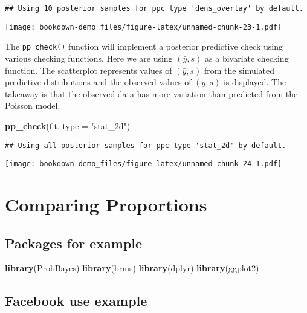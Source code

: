 \documentclass[
]{book}
\newenvironment{Shaded}{\begin{snugshade}}{\end{snugshade}}
\newcommand{\DataTypeTok}[1]{\textcolor[rgb]{0.13,0.29,0.53}{#1}}
\newcommand{\KeywordTok}[1]{\textcolor[rgb]{0.13,0.29,0.53}{\textbf{#1}}}
\newcommand{\NormalTok}[1]{#1}
\newcommand{\StringTok}[1]{\textcolor[rgb]{0.31,0.60,0.02}{#1}}
\begin{document}
\begin{verbatim}
## Using 10 posterior samples for ppc type 'dens_overlay' by default.
\end{verbatim}

\texttt{[image: bookdown-demo\_files/figure-latex/unnamed-chunk-23-1.pdf]}

The \texttt{pp\_check()} function will implement a posterior predictive check using various checking functions. Here we are using \((\bar y, s)\) as a bivariate checking function. The scatterplot represents values of \((\bar y, s)\) from the simulated predictive distributions and the observed values of \((\bar y, s)\) is displayed. The takeaway is that the observed data has more variation than predicted from the Poisson model.

\begin{Shaded}
\begin{Highlighting}[]
\KeywordTok{pp_check}\NormalTok{(fit, }\DataTypeTok{type =} \StringTok{"stat_2d"}\NormalTok{)}
\end{Highlighting}
\end{Shaded}

\begin{verbatim}
## Using all posterior samples for ppc type 'stat_2d' by default.
\end{verbatim}

\texttt{[image: bookdown-demo\_files/figure-latex/unnamed-chunk-24-1.pdf]}

\hypertarget{comparing-proportions}{%
\chapter{Comparing Proportions}\label{comparing-proportions}}

\hypertarget{packages-for-example}{%
\section{Packages for example}\label{packages-for-example}}

\begin{Shaded}
\begin{Highlighting}[]
\KeywordTok{library}\NormalTok{(ProbBayes)}
\KeywordTok{library}\NormalTok{(brms)}
\KeywordTok{library}\NormalTok{(dplyr)}
\KeywordTok{library}\NormalTok{(ggplot2)}
\end{Highlighting}
\end{Shaded}

\hypertarget{facebook-use-example}{%
\section{Facebook use example}\label{facebook-use-example}}
\end{document}
